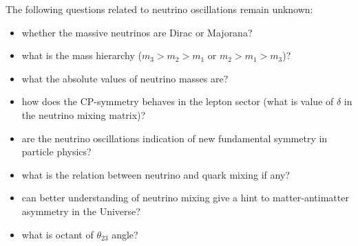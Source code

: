 The following questions related to neutrino oscillations remain unknown: 
\begin{itemize}
  \item whether the massive neutrinos are Dirac or Majorana?
  \item what is the mass hierarchy ($m_3>m_2>m_1$ or $m_2>m_1>m_3$)?
  \item what the absolute values of neutrino masses are?
  \item how does the CP-symmetry behaves in the lepton sector (what is value of $\delta$ in the neutrino mixing matrix)?
  \item are the neutrino oscillations indication of new fundamental symmetry in particle physics?
  \item what is the relation between neutrino and quark mixing if any?
  \item can better understanding of neutrino mixing give a hint to matter-antimatter asymmetry in the Universe?
  \item what is octant of $\theta_{23}$ angle?
\end{itemize} 
